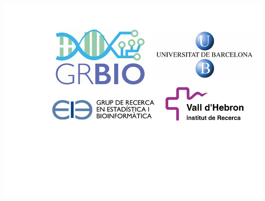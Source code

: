{\begin{minipage}{0.6\textwidth}
\vspace*{0.4cm}
\end{minipage}

\begin{minipage}{0.2\textwidth}
\begin{center}
   \includegraphics[width=14cm]{images/allLogos.png}
   \end{center}
\end{minipage}
}